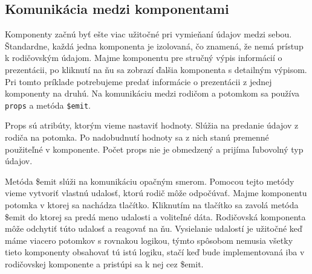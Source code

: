\subsection*{Komunikácia medzi komponentami}
Komponenty začnú byť ešte viac užitočné pri vymieňaní údajov medzi sebou. Štandardne, každá jedna komponenta je izolovaná, čo znamená, že nemá prístup k rodičovským údajom. Majme komponentu pre stručný výpis informácií o prezentácii, po kliknutí na ňu sa zobrazí ďalšia komponenta s detailným výpisom. Pri tomto príklade potrebujeme predať informácie o prezentácii z jednej komponenty na druhú. Na komunikáciu medzi rodičom a potomkom sa používa \texttt{props} a metóda \texttt{\$emit}.

Props sú atribúty, ktorým vieme nastaviť hodnoty. Slúžia na predanie údajov z rodiča na potomka. Po nadobudnutí hodnoty sa z nich stanú premenné použiteľné v komponente. Počet props nie je obmedzený a prijíma ľubovolný typ údajov.

Metóda \$emit slúži na komunikáciu opačným smerom. Pomocou tejto metódy vieme vytvoriť vlastnú udalosť, ktorú rodič môže odpočúvať. Majme komponentu potomka v ktorej sa nachádza tlačítko. Kliknutím na tlačítko sa zavolá metóda \$emit do ktorej sa predá meno udalosti a voliteľné dáta. Rodičovská komponenta môže odchytiť túto udalosť a reagovať na ňu. Vysielanie udalostí je užitočné keď máme viacero potomkov s rovnakou logikou, týmto spôsobom nemusia všetky tieto komponenty obsahovať tú istú logiku, stačí keď bude implementovaná iba v rodičovskej komponente a pristúpi sa k nej cez \$emit.

